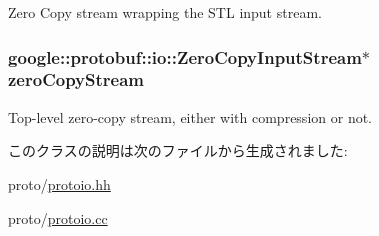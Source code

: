 Zero Copy stream wrapping the STL input stream. \hypertarget{classProtoInputStream_ac8cebc34dff8667f4d940ad84a61ea13}{
\subsubsection[{zeroCopyStream}]{\setlength{\rightskip}{0pt plus 5cm}google::protobuf::io::ZeroCopyInputStream$\ast$ {\bf zeroCopyStream}}}
\label{classProtoInputStream_ac8cebc34dff8667f4d940ad84a61ea13}


Top-\/level zero-\/copy stream, either with compression or not. 

このクラスの説明は次のファイルから生成されました:\begin{DoxyCompactItemize}
\item 
proto/\hyperlink{protoio_8hh}{protoio.hh}\item 
proto/\hyperlink{protoio_8cc}{protoio.cc}\end{DoxyCompactItemize}
